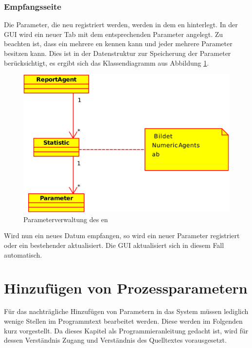 	\subsection{Empfangsseite}
	Die Parameter, die neu registriert werden, werden in dem \repag{}en hinterlegt. In der GUI wird ein neuer Tab mit dem entsprechenden Parameter angelegt. Zu beachten ist, dass ein \repag{} mehrere \numag{}en kennen kann und jeder \numag{} mehrere Parameter besitzen kann. Dies ist in der Datenstruktur zur Speicherung der Parameter berücksichtigt, es ergibt sich das Klassendiagramm aus Abbildung \ref{repag_params}.
	\begin{figure}[ht]
		\centering
		\includegraphics[keepaspectratio=true, width=\textwidth]{res/Klassendiagramm_ReportAgent_Parameterverwaltung.png}
		\caption{Parameterverwaltung des \repag{}en}
		\label{repag_params}
	\end{figure}\parag{}
	Wird nun ein neues Datum empfangen, so wird ein neuer Parameter registriert oder ein bestehender aktualisiert. Die GUI aktualisiert sich in diesem Fall automatisch.
	
	\chapter{Hinzufügen von Prozessparametern}\label{kap_AddParameter}
	Für das nachträgliche Hinzufügen von Parametern in das System müssen lediglich wenige Stellen im Programmtext bearbeitet werden. Diese werden im Folgenden kurz vorgestellt. Da dieses Kapitel als Programmieranleitung gedacht ist, wird für dessen Verständnis Zugang und Verständnis des Quelltextes vorausgesetzt.
	
